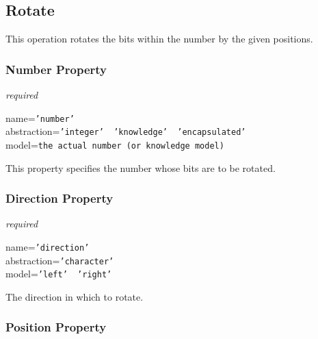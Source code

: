 %
%
%
%
%
%

\subsection{Rotate}
\label{rotate_heading}

This operation rotates the bits within the number by the given positions.

\subsubsection{Number Property}

\emph{required}

name=\texttt{'number'}\\
abstraction=\texttt{'integer' \vline\ 'knowledge' \vline\ 'encapsulated'}\\
model=\texttt{the actual number (or knowledge model)}

This property specifies the number whose bits are to be rotated.

\subsubsection{Direction Property}

\emph{required}

name=\texttt{'direction'}\\
abstraction=\texttt{'character'}\\
model=\texttt{'left' \vline\ 'right'}

The direction in which to rotate.

\subsubsection{Position Property}

